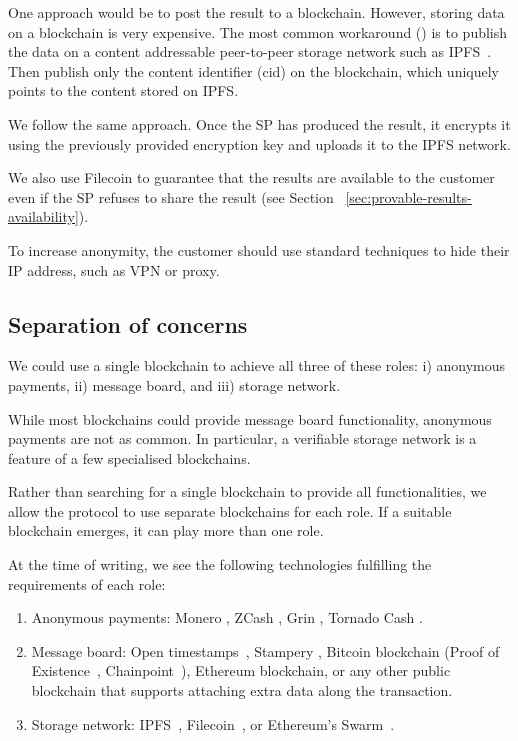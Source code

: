 \documentclass[pdftex,twocolumn,epjc3]{svjour3}
\begin{document}
{One approach would be to post the result to a blockchain. However, storing data on a blockchain is very expensive. The most common workaround (\cite{shahidBlockchainBasedAgriFoodSupply2020, wangAuditableProtocolsFair2019, chenImprovedP2PFile2017}) is to publish the data on a content addressable peer-to-peer storage network such as IPFS~\cite{benetIPFSContentAddressed2014}. Then publish only the content identifier ($\mathrm{cid}$) on the blockchain, which uniquely points to the content stored on IPFS.

We follow the same approach. Once the SP has produced the result, it encrypts it using the previously provided encryption key and uploads it to the IPFS network.

We also use Filecoin to guarantee that the results are available to the customer even if the SP refuses to share the result (see Section ~\ref{sec:provable-results-availability}).

To increase anonymity, the customer should use standard techniques to hide their IP address, such as VPN or proxy.

\subsection{Separation of concerns}
We could use a single blockchain to achieve all three of these roles: i) anonymous payments, ii) message board, and iii) storage network.

While most blockchains could provide message board functionality, anonymous payments are not as common. In particular, a verifiable storage network is a feature of a few specialised blockchains.

Rather than searching for a single blockchain to provide all functionalities, we allow the protocol to use separate blockchains for each role. If a suitable blockchain emerges, it can play more than one role.

At the time of writing, we see the following technologies fulfilling the requirements of each role:

\begin{enumerate}
\def\labelenumi{\arabic{enumi}.}

\item Anonymous payments: Monero \cite{vansaberhagenCryptoNote2013}, ZCash
  \cite{ben-sassonZerocashDecentralizedAnonymous2014}, Grin \cite{fuchsbauerAggregateCashSystems2019},
  Tornado Cash \cite{pertsevTornadoCashPrivacy2019}.
\item Message board: Open timestamps~\cite{opentimestampsTimestampingProofStandard}, Stampery \cite{crespoStamperyBlockchainTimestamping2017}, Bitcoin blockchain (Proof of Existence~\cite{proofofexistenceWebApplicationProve}, Chainpoint~\cite{chainpointBlockchainProofAnchoring}), Ethereum blockchain, or any other public blockchain that supports attaching extra data along the transaction.
\item Storage network: IPFS~\cite{benetIPFSContentAddressed2014}, Filecoin~\cite{protocollabsFilecoinDecentralizedStorage2017}, or Ethereum's
  Swarm~\cite{teamSWARMStorageCommunication2021}.
\end{enumerate}

}
\end{document}
